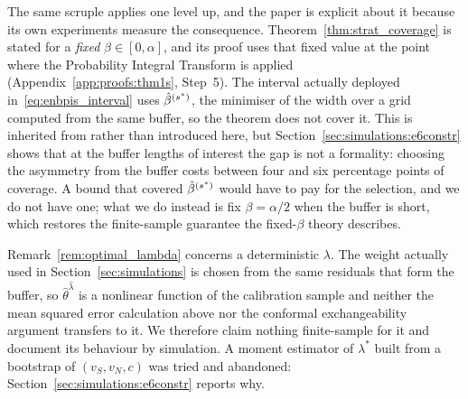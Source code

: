 \begin{remark}
\label{rem:beta_honesty}
The same scruple applies one level up, and the paper is explicit about
it because its own experiments measure the consequence.
Theorem~\ref{thm:strat_coverage} is stated for a \emph{fixed}
$\beta \in [0,\alpha]$, and its proof uses that fixed value at the
point where the Probability Integral Transform is applied
(Appendix~\ref{app:proofs:thm1s}, Step~5).  The interval actually
deployed in~\eqref{eq:enbpis_interval} uses
$\hat{\beta}^{(s^*)}$, the minimiser of the width over a grid
computed from the same buffer, so the theorem does not cover it.  This
is inherited from \citet{xu2023conformal} rather than introduced here,
but Section~\ref{sec:simulations:e6constr} shows that at the buffer
lengths of interest the gap is not a formality: choosing the asymmetry
from the buffer costs between four and six percentage points of
coverage.  A bound that covered $\hat{\beta}^{(s^*)}$ would have to
pay for the selection, and we do not have one; what we do instead is
fix $\beta = \alpha/2$ when the buffer is short, which restores the
finite-sample guarantee the fixed-$\beta$ theory describes.
\end{remark}

\begin{remark}
\label{rem:lambda_honesty}
Remark~\ref{rem:optimal_lambda} concerns a deterministic $\lambda$.  The
weight actually used in Section~\ref{sec:simulations} is chosen from the
same residuals that form the buffer, so $\hat{\theta}^{\hat\lambda}$ is a
nonlinear function of the calibration sample and neither the mean squared
error calculation above nor the conformal exchangeability argument
transfers to it.  We therefore claim nothing finite-sample for it and
document its behaviour by simulation.  A moment estimator of $\lambda^{*}$
built from a bootstrap of $(v_S, v_N, c)$ was tried and abandoned:
Section~\ref{sec:simulations:e6constr} reports why.
\end{remark}
